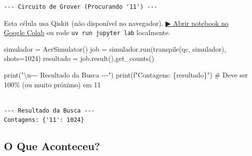 \documentclass[
  brazilian,
]{report}
\newenvironment{Shaded}{\begin{snugshade}}{\end{snugshade}}
\newcommand{\BuiltInTok}[1]{\textcolor[rgb]{0.00,0.23,0.31}{#1}}
\newcommand{\CharTok}[1]{\textcolor[rgb]{0.13,0.47,0.30}{#1}}
\newcommand{\CommentTok}[1]{\textcolor[rgb]{0.37,0.37,0.37}{#1}}
\newcommand{\DecValTok}[1]{\textcolor[rgb]{0.68,0.00,0.00}{#1}}
\newcommand{\NormalTok}[1]{\textcolor[rgb]{0.00,0.23,0.31}{#1}}
\newcommand{\OperatorTok}[1]{\textcolor[rgb]{0.37,0.37,0.37}{#1}}
\newcommand{\SpecialCharTok}[1]{\textcolor[rgb]{0.37,0.37,0.37}{#1}}
\newcommand{\SpecialStringTok}[1]{\textcolor[rgb]{0.13,0.47,0.30}{#1}}
\newcommand{\StringTok}[1]{\textcolor[rgb]{0.13,0.47,0.30}{#1}}
\begin{document}
\begin{verbatim}
--- Circuito de Grover (Procurando '11') ---
\end{verbatim}

\begin{tcolorbox}[enhanced jigsaw, arc=.35mm, bottomrule=.15mm, bottomtitle=1mm, breakable, colback=white, colbacktitle=quarto-callout-warning-color!10!white, colframe=quarto-callout-warning-color-frame, coltitle=black, left=2mm, leftrule=.75mm, opacityback=0, opacitybacktitle=0.6, rightrule=.15mm, title=\textcolor{quarto-callout-warning-color}{\faExclamationTriangle}\hspace{0.5em}{⚛️ Célula Qiskit --- execute no Colab ou localmente}, titlerule=0mm, toprule=.15mm, toptitle=1mm]

Esta célula usa Qiskit (não disponível no navegador).
\href{https://colab.research.google.com/github/maxwellamaral/aula-quantum/blob/main/notebooks/06-grover.ipynb}{▶
Abrir notebook no Google Colab} ou rode \texttt{uv\ run\ jupyter\ lab}
localmente.

\begin{Shaded}
\begin{Highlighting}[]


\NormalTok{simulador }\OperatorTok{=}\NormalTok{ AerSimulator()}
\NormalTok{job }\OperatorTok{=}\NormalTok{ simulador.run(transpile(qc, simulador), shots}\OperatorTok{=}\DecValTok{1024}\NormalTok{)}
\NormalTok{resultado }\OperatorTok{=}\NormalTok{ job.result().get\_counts()}

\BuiltInTok{print}\NormalTok{(}\StringTok{"}\CharTok{\textbackslash{}n}\StringTok{{-}{-}{-} Resultado da Busca {-}{-}{-}"}\NormalTok{)}
\BuiltInTok{print}\NormalTok{(}\SpecialStringTok{f"Contagens: }\SpecialCharTok{\{}\NormalTok{resultado}\SpecialCharTok{\}}\SpecialStringTok{"}\NormalTok{)}
\CommentTok{\# Deve ser 100\% (ou muito próximo) em \textquotesingle{}11\textquotesingle{}}
\end{Highlighting}
\end{Shaded}

\end{tcolorbox}

\begin{verbatim}

--- Resultado da Busca ---
Contagens: {'11': 1024}
\end{verbatim}

\subsection{O Que Aconteceu?}\label{o-que-aconteceu}
\end{document}
